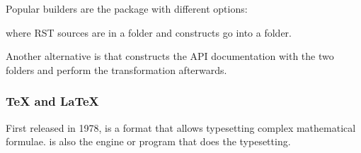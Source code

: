 \documentclass[a4paper,12pt,english]{sphinxhowto}
\begin{document}
Popular builders are  the  package  with different options:
\begin{quote}

\begin{sphinxVerbatim}[commandchars=\\\{\},formatcom=\footnotesize]
    
    
\end{sphinxVerbatim}
\end{quote}

where RST sources are in a  folder and constructs go into a  folder.

Another alternative is  that constructs the API documentation with the two folders and perform
the transformation afterwards.
\begin{quote}

\begin{sphinxVerbatim}[commandchars=\\\{\},formatcom=\footnotesize]
  \PYG{p}{[}\PYG{p}{]}   
  \PYG{p}{[}\PYG{p}{]}   
\end{sphinxVerbatim}
\end{quote}



\subsubsection{TeX and LaTeX}
\label{\detokenize{DDHH:tex-and-latex}}
First released in 1978,  is a format that allows typesetting complex mathematical formulae.  is also the engine or program
that does the typesetting.
\end{document}
